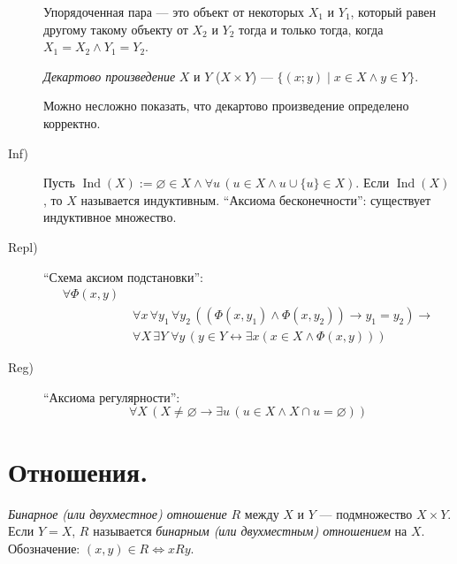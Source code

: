 \documentclass[12pt,a4paper]{article}
\DeclareMathOperator{\Ind}{Ind}
\begin{document}
\begin{definition}[аксиомы ZFC (= ZF (аксиомы Цермело-Френкеля) + C (аксиома выбора))]
\begin{description}
                \begin{definition}
                    Упорядоченная пара --- это объект от некоторых $X_1$ и $Y_1$, который равен другому такому объекту от $X_2$ и $Y_2$ тогда и только тогда, когда $X_1 = X_2 \wedge Y_1 = Y_2$.
                \end{definition}

                \begin{definition}
                    \emph{Декартово произведение} $X$ и $Y$ ($X \times Y$) --- $\{(x; y) \mid x \in X \wedge y \in Y\}$. 
                \end{definition}

                \begin{remark}
                    Можно несложно показать, что декартово произведение определено корректно.
                \end{remark}
            \item[Inf)] Пусть $\Ind(X) := \varnothing \in X \wedge \forall u\, (u \in X \wedge u \cup \{u\} \in X)$. Если $\Ind(X)$, то $X$ называется индуктивным. ``Аксиома бесконечности'': существует индуктивное множество.
            \item[Repl)] ``Схема аксиом подстановки'':
                \begin{align*}
                    \forall \Phi(x, y)\;&\\
                    &\forall x\, \forall y_1\, \forall y_2\, ((\Phi(x, y_1) \wedge \Phi(x, y_2)) \rightarrow y_1 = y_2) \rightarrow\\
                    &\forall X\, \exists Y\; \forall y\, (y \in Y \leftrightarrow \exists x (x \in X \wedge \Phi(x, y)))
                \end{align*}
            \item[Reg)] ``Аксиома регулярности'':
                \[
                    \forall X\, (X\neq \varnothing \rightarrow \exists u\, (u\in X \wedge X \cap u = \varnothing))
                \]
        \end{description}
    \end{definition}

    \section{Отношения.}

    \begin{definition}
        \emph{Бинарное (или двухместное) отношение} $R$ между $X$ и $Y$ --- подмножество $X \times Y$. Если $Y = X$, $R$ называется \emph{бинарным (или двухместным) отношением} на $X$.\\
        Обозначение: $(x, y) \in R \Leftrightarrow xRy$.
    \end{definition}
\end{document}

